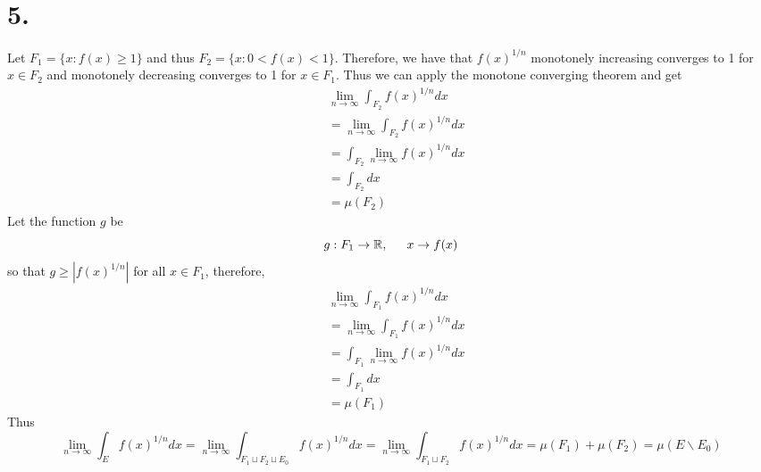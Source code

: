 \documentclass[11pt]{article}
\theoremstyle{mystyle}
\theoremstyle{definition}
\begin{document}
\section*{5.}
Let $F_1 = \{x: f(x) \ge 1\}$ and thus $F_2 = \{x: 0< f(x) < 1\}$. Therefore, we have that $f(x)^{1/n}$ monotonely increasing converges to 1 for $x \in F_2$ and monotonely decreasing converges to 1 for $x \in F_1$. Thus we can apply the monotone converging theorem and get 
\begin{align*}
  &\lim_{n \to \infty} \int_{F_2} f(x)^{1/n} dx \\
  &= \lim_{n \to \infty} \int_{F_2} f(x)^{1/n} dx \\
  &= \int_{F_2} \lim_{n \to \infty} f(x)^{1/n} dx \\
  &= \int_{F_2} dx \\
  &= \mu(F_2)
\end{align*}
Let the function $g$ be 
\[
  g: F_1 \to \mathbb{R}, \indent x \to f(x)
\]
so that $g \ge |f(x)^{1/n}|$ for all $x \in F_1$, therefore, 
\begin{align*}
  &\lim_{n \to \infty} \int_{F_1} f(x)^{1/n} dx \\
  &= \lim_{n \to \infty} \int_{F_1} f(x)^{1/n} dx \\
  &= \int_{F_1} \lim_{n \to \infty} f(x)^{1/n} dx \\
  &= \int_{F_1} dx \\
  &= \mu(F_1)
\end{align*}
Thus 
\[
  \lim_{n \to \infty} \int_E f(x)^{1/n} dx = \lim_{n \to \infty} \int_{F_1 \sqcup F_2 \sqcup E_0} f(x)^{1/n} dx = \lim_{n \to \infty} \int_{F_1 \sqcup F_2} f(x)^{1/n} dx = \mu(F_1) + \mu(F_2) = \mu(E \backslash E_0)
\]
\end{document}
